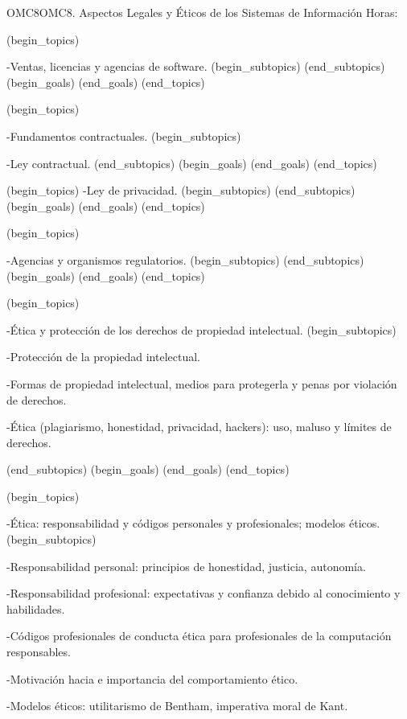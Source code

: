 \begin{BKL2}{OMC8}{OMC8. Aspectos Legales y Éticos de los Sistemas de Información}
Horas:
 
(begin_topics)

-Ventas, licencias y agencias de software.
(begin_subtopics)
(end_subtopics)
(begin_goals)
(end_goals)
(end_topics)

 

(begin_topics)

-Fundamentos contractuales.
(begin_subtopics)

-Ley contractual.
(end_subtopics)
(begin_goals)
(end_goals)
(end_topics)

 

(begin_topics)
-Ley de privacidad.
(begin_subtopics)
(end_subtopics)
(begin_goals)
(end_goals)
(end_topics)

 

(begin_topics)

-Agencias y organismos regulatorios.
(begin_subtopics)
(end_subtopics)
(begin_goals)
(end_goals)
(end_topics)

 

(begin_topics)

-Ética y protección de los derechos de propiedad intelectual.
(begin_subtopics)

-Protección de la propiedad intelectual.

-Formas de propiedad intelectual, medios para protegerla y penas por violación de derechos.

-Ética (plagiarismo, honestidad, privacidad, hackers): uso, maluso y límites de derechos.

(end_subtopics)
(begin_goals)
(end_goals)
(end_topics)

 

(begin_topics)

-Ética: responsabilidad y códigos personales y profesionales; modelos éticos.
(begin_subtopics)

-Responsabilidad personal: principios de honestidad, justicia, autonomía.

-Responsabilidad profesional: expectativas y confianza debido al conocimiento y habilidades.

-Códigos profesionales de conducta ética para profesionales de la computación responsables.

-Motivación hacia e importancia del comportamiento ético.

-Modelos éticos: utilitarismo de Bentham, imperativa moral de Kant.


\end{BKL2}
